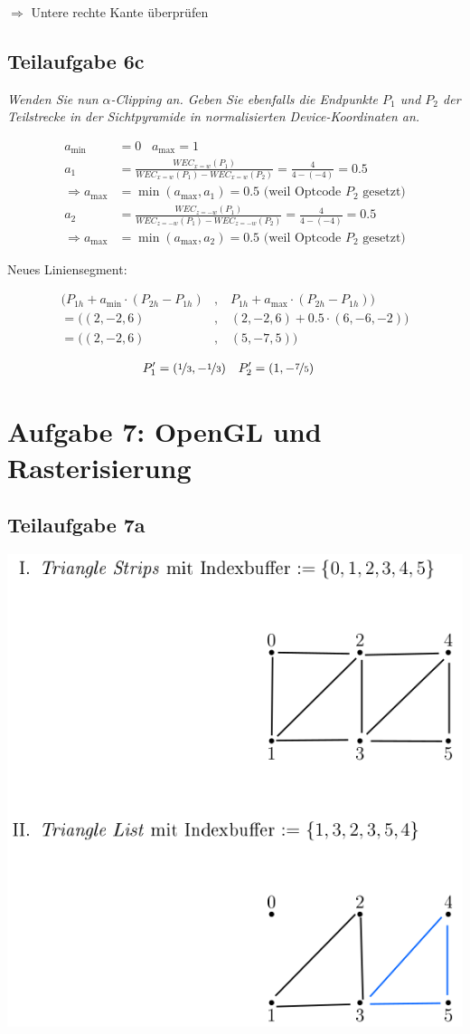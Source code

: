 \documentclass[a4paper]{scrartcl}
\begin{document}
$\Rightarrow$ Untere rechte Kante überprüfen

\subsection*{Teilaufgabe 6c}
\textit{Wenden Sie nun $\alpha$-Clipping an. Geben Sie ebenfalls die Endpunkte
$P_1$ und $P_2$ der Teilstrecke in der Sichtpyramide in normalisierten
Device-Koordinaten an.}

\begin{align}
    a_{\text{min}} &= 0\;\;\; a_{\text{max}} = 1\\
    a_1 &= \frac{WEC_{x=w}(P_1)}{WEC_{x=w}(P_1) - WEC_{x=w}(P_2)} = \frac{4}{4 - (-4)} = 0.5\\
    \Rightarrow a_{\text{max}} &= \min(a_{\text{max}}, a_1) = 0.5 \text{ (weil Optcode } P_2 \text{ gesetzt)}\\
    a_2 &= \frac{WEC_{z=-w}(P_1)}{WEC_{z=-w}(P_1) - WEC_{z=-w}(P_2)} = \frac{4}{4 - (-4)} = 0.5\\
    \Rightarrow a_{\text{max}} &= \min(a_{\text{max}}, a_2) = 0.5 \text{ (weil Optcode } P_2 \text{ gesetzt)}
\end{align}

Neues Liniensegment:

\begin{align}
    (P_{1h} + a_{\text{min}} \cdot (P_{2h} - P_{1h})&,\;\;\; P_{1h} + a_{\text{max}} \cdot (P_{2h} - P_{1h}))\\
  = ((2, -2, 6)&,\;\;\; (2, -2, 6) + 0.5 \cdot (6, -6, -2))\\
  = ((2, -2, 6)&,\;\;\; (5, -7, 5))
\end{align}

\begin{align}
    P_1' &= (\nicefrac{1}{3}, -\nicefrac{1}{3}) & P_2' &= (1, -\nicefrac{7}{5})
\end{align}

\clearpage
\section*{Aufgabe 7: OpenGL und Rasterisierung}
\subsection*{Teilaufgabe 7a}
\includegraphics*[width=0.5\linewidth, keepaspectratio]{7a.png}
\end{document}
